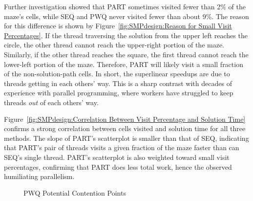 Further investigation showed that
PART sometimes visited fewer than 2\% of the maze's cells,
while SEQ and PWQ never visited fewer than about 9\%.
The reason for this difference is shown by
Figure~\ref{fig:SMPdesign:Reason for Small Visit Percentages}.
If the thread traversing the solution from the upper left reaches
the circle, the other thread cannot reach
the upper-right portion of the maze.
Similarly, if the other thread reaches the square,
the first thread cannot reach the lower-left
portion of the maze.
Therefore, PART will likely visit a small fraction
of the non-solution-path cells.
In short, the superlinear speedups are due to threads getting in each
others' way.
This is a sharp contrast with decades of experience with
parallel programming, where workers have struggled
to keep threads \emph{out} of each others' way.

Figure~\ref{fig:SMPdesign:Correlation Between Visit Percentage and Solution Time}
confirms a strong correlation between cells visited and solution time
for all three methods.
The slope of PART's scatterplot is smaller than that of SEQ,
indicating that PART's pair of threads visits a given fraction
of the maze faster than can SEQ's single thread.
PART's scatterplot is also weighted toward small visit
percentages, confirming that PART does less total work, hence
the observed humiliating parallelism.

\begin{figure}[tb]
\begin{center}
\end{center}
\caption{PWQ Potential Contention Points}
\label{fig:SMPdesign:PWQ Potential Contention Points}
\end{figure}

